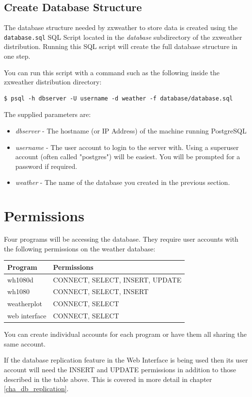 \documentclass[a4paper,10pt,draft]{book}
\begin{document}
\subsection{Create Database Structure}
The database structure needed by zxweather to store data is created using the \verb|database.sql| SQL Script located in the \emph{database} subdirectory of the zxweather distribution. Running this SQL script will create the full database structure in one step.

You can run this script with a command such as the following inside the zxweather distribution directory:
\begin{verbatim}
$ psql -h dbserver -U username -d weather -f database/database.sql 
\end{verbatim}
The supplied parameters are:
\begin{itemize}
\item \emph{dbserver} - The hostname (or IP Address) of the machine running PostgreSQL
\item \emph{username} - The user account to login to the server with. Using a superuser account (often called "postgres") will be easiest. You will be prompted for a password if required.
\item \emph{weather} - The name of the database you created in the previous section.
\end{itemize}

\section{Permissions}
Four programs will be accessing the database. They require user accounts with the following permissions on the weather database:

\begin{tabular}{l l}
\hline
\textbf{Program} & \textbf{Permissions} \\
\hline
wh1080d & CONNECT, SELECT, INSERT, UPDATE \\
wh1080 & CONNECT, SELECT, INSERT \\
weatherplot & CONNECT, SELECT \\
web interface & CONNECT, SELECT \\
\hline
\end{tabular}

You can create individual accounts for each program or have them all sharing the same account.

If the database replication feature in the Web Interface is being used then its user account will need the INSERT and UPDATE permissions in addition to those described in the table above. This is covered in more detail in chapter \ref{cha_db_replication}.
\end{document}
